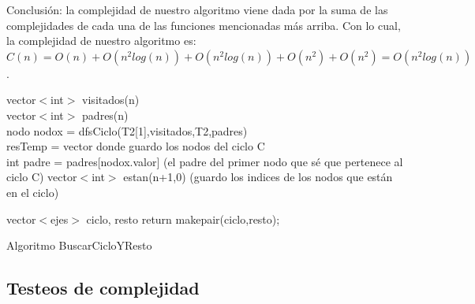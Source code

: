 \documentclass[11pt, a4paper, twoside]{article}
\begin{document}
\begin{enumerate}
\end{enumerate}

Conclusión: la complejidad de nuestro algoritmo viene dada por la suma de las complejidades de cada
una de las funciones mencionadas más arriba. Con lo cual, la complejidad de nuestro algoritmo es: 
$ C(n) = O(n) + O(n^2 log(n)) + O(n^2 log(n)) + O(n^2) + O(n^2) = O(n^2 log(n))$. 

\begin{algorithm}[H]
          
          vector$<$int$>$ visitados(n) \\
          vector$<$int$>$ padres(n) \\
          nodo nodox = dfsCiclo(T2[1],visitados,T2,padres) \\     
          resTemp = vector donde guardo los nodos del ciclo C \\
          int padre = padres[nodox.valor] (el padre del primer nodo que sé que pertenece al ciclo C)
		  vector$<$int$>$ estan(n+1,0) (guardo los indices de los nodos que están en el ciclo) \\
		  
		  vector$<$ejes$>$ ciclo, resto
		  return makepair(ciclo,resto);
		  
\caption{Algoritmo BuscarCicloYResto}
\end{algorithm}

\subsection{Testeos de complejidad}



\end{document}
